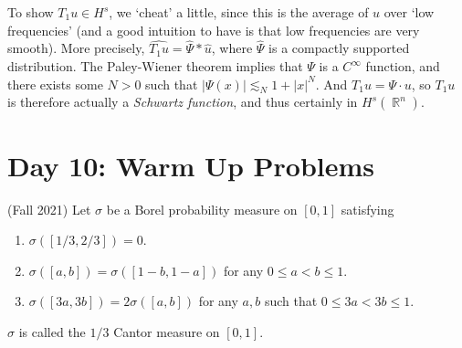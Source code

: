 \documentclass{exam}
\DeclareMathOperator{\RR}{\mathbb{R}}
\theoremstyle{problemstyle}
\newcommand{\1}[1]{\textbf{1}_{\left[#1\right]}} %
\begin{document}
\begin{questions}
\begin{solution}
    To show $T_1 u \in H^s$, we `cheat' a little, since this is the average of $u$ over `low frequencies' (and a good intuition to have is that low frequencies are very smooth). More precisely, $\widehat{T_1 u} = \widehat{\Psi} * \widehat{u}$, where $\widehat{\Psi}$ is a compactly supported distribution. The Paley-Wiener theorem implies that $\Psi$ is a $C^\infty$ function, and there exists some $N > 0$ such that $|\Psi(x)| \lesssim_N 1 + |x|^N$. And $T_1 u = \Psi \cdot u$, so $T_1 u$ is therefore actually a \emph{Schwartz function}, and thus certainly in $H^s(\RR^n)$.
\end{solution}





\newpage
\section*{Day 10: Warm Up Problems}

\question (Fall 2021) Let $\sigma$ be a Borel probability measure on $[0,1]$ satisfying
%
\begin{enumerate}
	\item $\sigma([1/3,2/3]) = 0$.
	\item $\sigma([a,b]) = \sigma([1-b,1-a])$ for any $0 \leq a < b \leq 1$.
	\item $\sigma([3a,3b]) = 2 \sigma([a,b])$ for any $a,b$ such that $0 \leq 3a < 3b \leq 1$.
\end{enumerate}
%
$\sigma$ is called the $1/3$ Cantor measure on $[0,1]$.
\end{questions}
\end{document}
